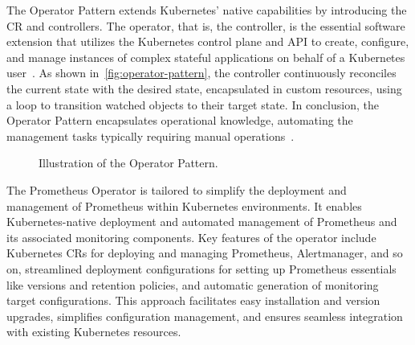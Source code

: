 The Operator Pattern extends Kubernetes' native capabilities by introducing the \ac{CR} and controllers. The operator, that is, the controller, is the essential software extension that utilizes the Kubernetes control plane and \ac{API} to create, configure, and manage instances of complex stateful applications on behalf of a Kubernetes user~\parencite{dobiesKubernetesOperators2020}. As shown in~\autoref{fig:operator-pattern}, the controller continuously reconciles the current state with the desired state, encapsulated in custom resources, using a loop to transition watched objects to their target state. In conclusion, the Operator Pattern encapsulates operational knowledge, automating the management tasks typically requiring manual operations~\parencite{CNCFOperatorWhite}. 

\begin{figure}[htpb]
    \centering
    \caption[Illustration of the Operator Pattern]{Illustration of the Operator Pattern.}\label{fig:operator-pattern}
\end{figure}

The Prometheus Operator is tailored to simplify the deployment and management of Prometheus within Kubernetes environments. It enables Kubernetes-native deployment and automated management of Prometheus and its associated monitoring components. Key features of the operator include Kubernetes \ac{CR}s for deploying and managing Prometheus, Alertmanager, and so on, streamlined deployment configurations for setting up Prometheus essentials like versions and retention policies, and automatic generation of monitoring target configurations. This approach facilitates easy installation and version upgrades, simplifies configuration management, and ensures seamless integration with existing Kubernetes resources. 


